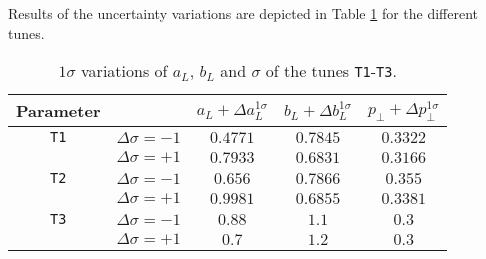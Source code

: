\documentclass[aps,preprint,floatfix,nofootinbib,showpacs]{revtex4-1}
\begin{document}
Results of the uncertainty variations are depicted in Table \ref{Table.variations1}
for the different tunes.


\begin{table}[!h]
 \begin{center}
 \begin{tabular}{ c | c | c | c | c  }
 \hline \hline
  Parameter   & & \hspace{0.4cm} $a_L + \Delta a_L^{1\sigma}$ \hspace{0.4cm}   & \hspace{0.4cm} $b_L + \Delta b_L^{1\sigma}$ \hspace{0.4cm} & \hspace{0.4cm} $p_\perp + \Delta p_\perp^{1\sigma}$ \hspace{0.4cm} \\ \hline \hline
  \texttt{T1} & $\Delta\sigma=-1$ \hspace{0.5cm}  & $0.4771$   & $0.7845$  & $0.3322$ \\ 
              & $\Delta\sigma=+1$ \hspace{0.5cm}  & $0.7933$  & $0.6831$ & $0.3166$ \\ \hline \hline
  \texttt{T2} & $\Delta\sigma=-1$ \hspace{0.5cm}  & $0.656$  & $0.7866$ & $0.355$ \\ 
              & $\Delta\sigma=+1$ \hspace{0.5cm}  & $0.9981$   & $0.6855$ & $0.3381$ \\ \hline \hline
  \texttt{T3} & $\Delta\sigma=-1$ \hspace{0.5cm}  &  $0.88$   &  $1.1$   &  $0.3$  \\
              & $\Delta\sigma=+1$ \hspace{0.5cm}  &  $0.7$    &  $1.2$   &   $0.3$  \\ \hline \hline
 \end{tabular}
 \end{center}
 \caption{$1\sigma$ variations of $a_L$, $b_L$ and $\sigma$ of the tunes \texttt{T1}-\texttt{T3}.}
 \label{Table.variations1}
\end{table}
\end{document}
